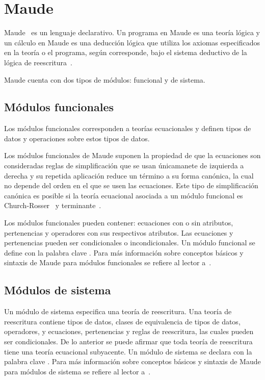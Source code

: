 \section{Maude}
\label{m.prelim}

Maude~\cite{maude-book} es un lenguaje declarativo. Un programa en Maude
es una teor\'ia l\'ogica y un c\'alculo en Maude es una deducci\'on l\'ogica que
utiliza los axiomas especificados en la teor\'ia o el programa, seg\'un
corresponde, bajo el sistema deductivo de la l\'ogica de reescritura~\cite{Meseguer199273}.

Maude cuenta con dos tipos de m\'odulos: funcional y de sistema.

 \subsection{M\'odulos funcionales}
 \label{mf.prelim}

 Los m\'odulos funcionales corresponden a teor\'ias ecuacionales y definen
 tipos de datos y operaciones sobre estos tipos de datos.

 Los m\'odulos funcionales de Maude suponen la propiedad de que la
 ecuaciones son consideradas reglas de simplificaci\'on que se usan
 \'unicamanete de izquierda a derecha y su repetida aplicaci\'on reduce un
 t\'ermino a su forma can\'onica, la cual no depende del orden en el que se
 usen las ecuaciones. Este tipo de simplificaci\'on can\'onica es posible si
 la teor\'ia ecuacional asociada a un m\'odulo funcional es
 Church-Rosser~\cite{DBLP:journals/jlp/DuranM12} y terminante~\cite{Lucas2009207}.

 Los m\'odulos funcionales pueden contener: ecuaciones con o sin atributos,
 pertenencias y operadores con sus respectivos atributos. Las ecuaciones
 y pertenencias pueden ser condicionales o incondicionales. Un m\'odulo
 funcional se define con la palabra clave . Para m\'as informaci\'on
 sobre conceptos b\'asicos y sintaxis de Maude para m\'odulos funcionales se
 refiere al lector a~\cite{maude-book}.

 \subsection{M\'odulos de sistema}
 \label{ms.prelim}

 Un m\'odulo de sistema especifica una teor\'ia de reescritura. Una teor\'ia de
 reescritura contiene tipos de datos, clases de equivalencia de
 tipos de datos, operadores, y ecuaciones, pertenencias y reglas de
 reescritura, las cuales pueden ser condicionales. De lo anterior se
 puede afirmar que toda teor\'ia de reescritura tiene una teor\'ia ecuacional
 subyacente. Un m\'odulo de sistema se declara con la palabra clave
 . Para m\'as informaci\'on sobre conceptos b\'asicos y sintaxis de
 Maude para m\'odulos de sistema se refiere al lector a~\cite{maude-book}.


